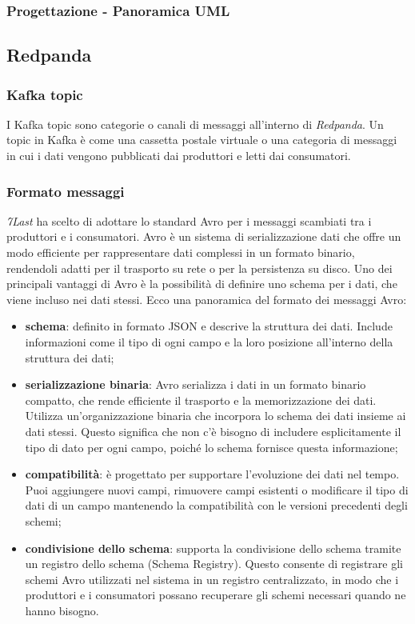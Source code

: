 \subsubsection{Progettazione - Panoramica UML}

\subsection{Redpanda}
\subsubsection{Kafka topic}
I Kafka topic sono categorie o canali di messaggi all'interno di \textit{Redpanda}. Un topic in Kafka è come una cassetta postale virtuale o una categoria di messaggi in cui i dati vengono pubblicati dai produttori e letti dai consumatori.
\subsubsection{Formato messaggi}
\textit{7Last} ha scelto di adottare lo standard Avro per i messaggi scambiati tra i produttori e i consumatori. Avro è un sistema di serializzazione dati che offre un modo efficiente per rappresentare dati complessi in un formato binario, rendendoli adatti per il trasporto su rete o per la persistenza su disco. Uno dei principali vantaggi di Avro è la possibilità di definire uno schema per i dati, che viene incluso nei dati stessi. Ecco una panoramica del formato dei messaggi Avro:
\begin{itemize}
	\item \textbf{schema}: definito in formato JSON e descrive la struttura dei dati. Include informazioni come il tipo di ogni campo e la loro posizione all'interno della struttura dei dati;
	\item \textbf{serializzazione binaria}: Avro serializza i dati in un formato binario compatto, che rende efficiente il trasporto e la memorizzazione dei dati. Utilizza un'organizzazione binaria che incorpora lo schema dei dati insieme ai dati stessi. Questo significa che non c'è bisogno di includere esplicitamente il tipo di dato per ogni campo, poiché lo schema fornisce questa informazione;
	\item \textbf{compatibilità}: è progettato per supportare l'evoluzione dei dati nel tempo. Puoi aggiungere nuovi campi, rimuovere campi esistenti o modificare il tipo di dati di un campo mantenendo la compatibilità con le versioni precedenti degli schemi;
	\item \textbf{condivisione dello schema}: supporta la condivisione dello schema tramite un registro dello schema (Schema Registry). Questo consente di registrare gli schemi Avro utilizzati nel sistema in un registro centralizzato, in modo che i produttori e i consumatori possano recuperare gli schemi necessari quando ne hanno bisogno.
\end{itemize}


